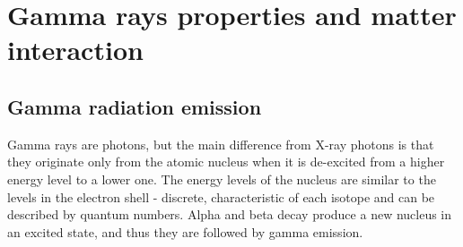 
\chapter{Gamma rays properties and matter interaction}
\label{gammas}

\section{Gamma radiation emission}


Gamma rays are photons, but the main difference from X-ray photons is that they originate only from the atomic nucleus when it is de-excited from a higher energy level to a lower one. The energy levels of the nucleus are similar to the levels in the electron shell - discrete, characteristic of each isotope and can be described by quantum numbers. Alpha and beta decay produce a new nucleus in an excited state, and thus they are followed by gamma emission.




